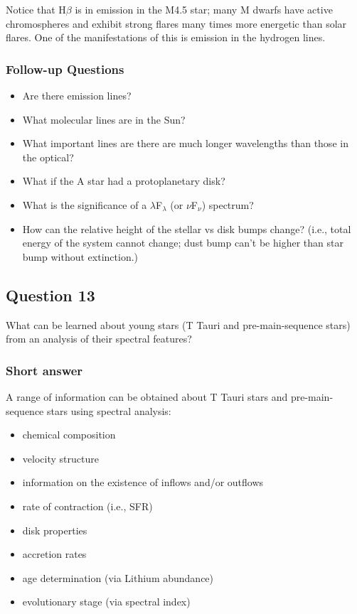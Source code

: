 \documentclass[a4paper,10pt]{article}
\begin{document}
{\noindent}Notice that H$\beta$ is in emission in the M4.5 star; many M dwarfs have active chromospheres and exhibit strong flares many times more energetic than solar flares. One of the manifestations of this is emission in the hydrogen lines.

\subsubsection{Follow-up Questions}

\begin{itemize}
    \item Are there emission lines?
    \item What molecular lines are in the Sun?
    \item What important lines are there are much longer wavelengths than those in the optical?
    \item What if the A star had a protoplanetary disk?
    \item What is the significance of a $\lambda$F$_\lambda$ (or $\nu$F$_\nu$) spectrum?
    \item How can the relative height of the stellar vs disk bumps change? (i.e., total energy of the system cannot change; dust bump can't be higher than star bump without extinction.)
\end{itemize}


\newpage
\subsection{Question 13}

What can be learned about young stars (T Tauri and pre-main-sequence stars) from an analysis of their spectral features?

\subsubsection{Short answer}

A range of information can be obtained about T Tauri stars and pre-main-sequence stars using spectral analysis:

\begin{itemize}
    \item chemical composition
    \item velocity structure
    \item information on the existence of inflows and/or outflows
    \item rate of contraction (i.e., SFR)
    \item disk properties
    \item accretion rates
    \item age determination (via Lithium abundance)
    \item evolutionary stage (via spectral index)
\end{itemize}
\end{document}
